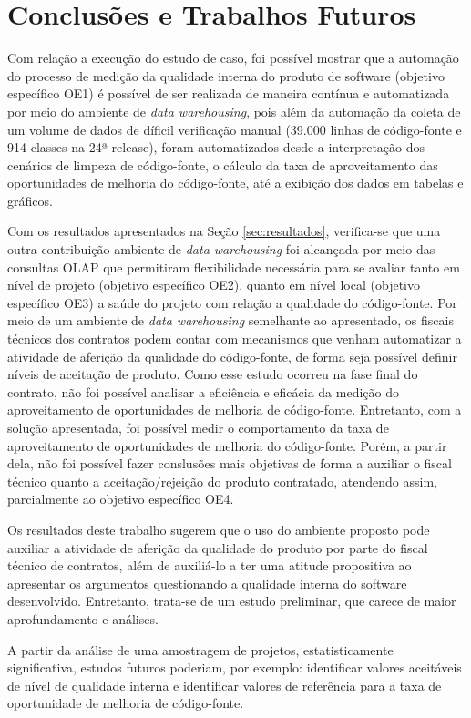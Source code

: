 \section{Conclusões e Trabalhos Futuros}


Com relação a execução do estudo de caso, foi possível mostrar que a automação do processo de medição da qualidade interna do produto de software (objetivo específico OE1)  é possível de ser realizada de maneira contínua e automatizada por meio do ambiente de \textit{data warehousing}, pois além da automação da coleta de um volume de dados de díficil verificação manual (39.000 linhas de código-fonte e 914 classes na 24ª release), foram automatizados desde a interpretação dos cenários de limpeza de código-fonte, o cálculo da taxa de aproveitamento das oportunidades de melhoria do código-fonte, até a exibição dos dados em tabelas e gráficos.

Com os resultados apresentados na Seção \ref{sec:resultados}, verifica-se que uma outra contribuição ambiente de \textit{data warehousing} foi alcançada por meio das consultas OLAP que permitiram flexibilidade necessária para se avaliar tanto em nível de projeto (objetivo específico OE2), quanto em nível local (objetivo específico OE3) a saúde do projeto com relação a qualidade do código-fonte. Por meio de um ambiente de \textit{data warehousing} semelhante ao apresentado, os fiscais técnicos dos contratos podem contar com mecanismos que venham automatizar a atividade de aferição da qualidade do código-fonte, de forma seja possível definir níveis de aceitação de produto.
Como esse estudo ocorreu na fase final do contrato, não foi possível analisar a eficiência e eficácia da medição do aproveitamento de oportunidades de melhoria de código-fonte. Entretanto, com a solução apresentada, foi possível medir o comportamento da taxa de aproveitamento de oportunidades de melhoria do código-fonte. Porém, a partir dela, não foi possível fazer conslusões mais objetivas de forma a auxiliar o fiscal técnico quanto a aceitação/rejeição do produto contratado, atendendo assim, parcialmente ao objetivo específico OE4.

Os resultados deste trabalho sugerem que o uso do ambiente proposto pode auxiliar a atividade de aferição da qualidade do produto por parte do fiscal técnico de contratos, além de auxiliá-lo a ter uma atitude propositiva ao apresentar os argumentos questionando a qualidade interna do software desenvolvido. Entretanto, trata-se de um estudo preliminar, que carece de maior aprofundamento e análises.

A partir da análise de uma amostragem de projetos, estatisticamente significativa, estudos futuros poderiam, por exemplo: identificar valores aceitáveis de nível de qualidade interna e identificar valores de referência para a taxa de oportunidade de melhoria de código-fonte.
